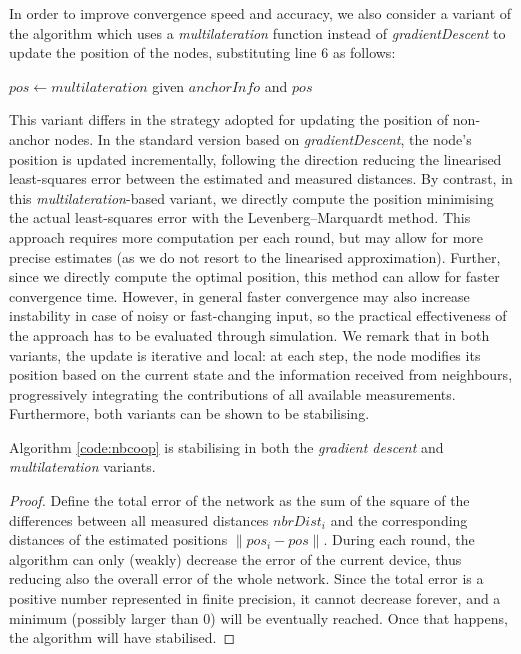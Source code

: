 \documentclass[runningheads]{llncs}
\newcommand{\Indent}{\hspace{\algorithmicindent}}
\begin{document}
In order to improve convergence speed and accuracy, we also consider a variant of the algorithm which uses a \emph{multilateration} function instead of \emph{gradientDescent} to update the position of the nodes, substituting line 6 as follows:
\begin{algorithmic}[1] \setcounter{ALG@line}{5}
    \State \Indent \Indent \Return $\mathit{pos} \gets \mathit{multilateration}$ given $\mathit{anchorInfo}$ and $\mathit{pos}$
\end{algorithmic}
This variant differs in the strategy adopted for updating the position of non-anchor nodes. In the standard version based on \emph{gradientDescent}, the node’s position is updated incrementally, following the direction reducing the linearised least-squares error between the estimated and measured distances.
By contrast, in this \emph{multilateration}-based variant, we directly compute the position minimising the actual least-squares error with the Levenberg–Marquardt method. This approach requires more computation per each round, but may allow for more precise estimates (as we do not resort to the linearised approximation). Further, since we directly compute the optimal position, this method can allow for faster convergence time. However, in general faster convergence may also increase instability in case of noisy or fast-changing input, so the practical effectiveness of the approach has to be evaluated through simulation.
We remark that in both variants, the update is iterative and local: at each step, the node modifies its position based on the current state and the information received from neighbours, progressively integrating the contributions of all available measurements.
Furthermore, both variants can be shown to be stabilising.

\begin{theorem}
    Algorithm \ref{code:nbcoop} is stabilising in both the \emph{gradient descent} and \emph{multilateration} variants.
\end{theorem}
\begin{proof}
    Define the total error of the network as the sum of the square of the differences between all measured distances $\mathit{nbrDist_i}$ and the corresponding distances of the estimated positions $\lVert \mathit{pos_i} - pos \rVert$.
    During each round, the algorithm can only (weakly) decrease the error of the current device, thus reducing also the overall error of the whole network. Since the total error is a positive number represented in finite precision, it cannot decrease forever, and a minimum (possibly larger than 0) will be eventually reached. Once that happens, the algorithm  will have stabilised.
\end{proof}
\end{document}
